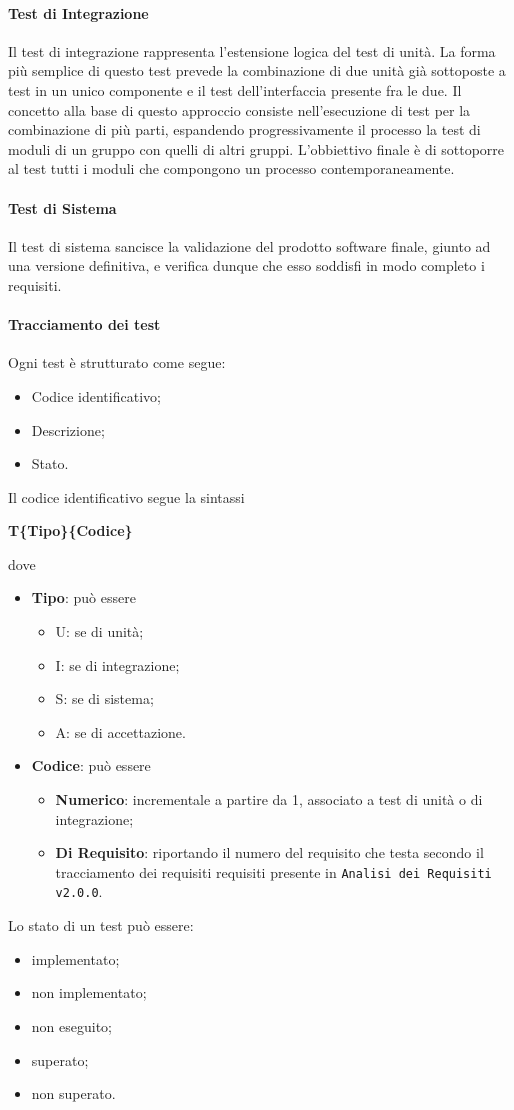 \paragraph{Test di Integrazione}
Il test di integrazione rappresenta l'estensione logica del test di unità. La forma più semplice di questo test prevede la combinazione di due unità già sottoposte a test in un unico componente e il test dell'interfaccia presente fra le due. Il concetto alla base di questo approccio consiste nell'esecuzione di test per la combinazione di più parti, espandendo progressivamente il processo la test di moduli di un gruppo con quelli di altri gruppi. L'obbiettivo finale è di sottoporre al test tutti i moduli che compongono un processo contemporaneamente. 
\paragraph{Test di Sistema}
Il test di sistema sancisce la validazione del prodotto software finale, giunto ad una versione definitiva, e verifica dunque che esso soddisfi in modo completo i requisiti. 
\paragraph{Tracciamento dei test}
Ogni test è strutturato come segue:
\begin{itemize}
	\item Codice identificativo;
	\item Descrizione;
	\item Stato.
\end{itemize}
Il codice identificativo segue la sintassi 
\begin{center}
	\textbf{T\{Tipo\}\{Codice\}}
\end{center}
dove 
\begin{itemize}
	\item \textbf{Tipo}: può essere
		\begin{itemize}
			\item U: se di unità;
			\item I: se di integrazione;
			\item S: se di sistema;
			\item A: se di accettazione.
		\end{itemize}
	\item \textbf{Codice}: può essere
		\begin{itemize}
			\item \textbf{Numerico}: incrementale a partire da 1, associato a test di unità o di integrazione;
			\item \textbf{Di Requisito}: riportando il numero del requisito che testa secondo il tracciamento dei requisiti requisiti presente in \texttt{Analisi dei Requisiti v2.0.0}.
		\end{itemize}
\end{itemize}
	Lo stato di un test può essere:
\begin{itemize}
	\item implementato;
	\item non implementato;
	\item non eseguito;
	\item superato;
	\item non superato.
\end{itemize}

